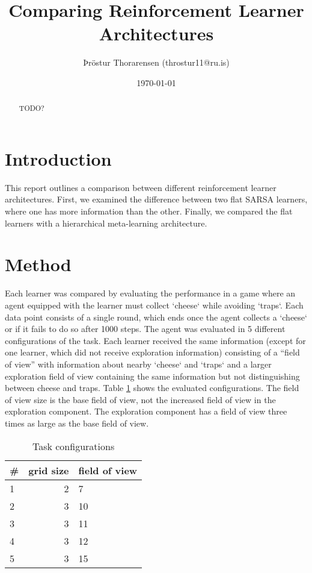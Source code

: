 \documentclass{article}
\begin{document}

\title{Comparing Reinforcement Learner Architectures}
\author{Þröstur Thorarensen (throstur11@ru.is)}
\date{\today}
\maketitle

\begin{abstract}
	TODO?
\end{abstract}

\newpage
\tableofcontents
\newpage

	\section{Introduction}
	This report outlines a comparison between different reinforcement learner architectures. First, we examined the difference between two flat SARSA learners, where one has more information than the other. Finally, we compared the flat learners with a hierarchical meta-learning architecture. 


	\section{Method}
	\label{sec:method}
	Each learner was compared by evaluating the performance in a game where an agent equipped with the learner must collect `cheese` while avoiding `traps`. Each data point consists of a single round, which ends once the agent collects a `cheese` or if it fails to do so after 1000 steps. The agent was evaluated in 5 different configurations of the task.
	Each learner received the same information (except for one learner, which did not receive exploration information) consisting of a ``field of view'' with information about nearby `cheese` and `traps` and a larger exploration field of view containing the same information but not distinguishing between cheese and traps.
	Table \ref{tbl:task-config} shows the evaluated configurations. The field of view size is the base field of view, not the increased field of view in the exploration component. The exploration component has a field of view three times as large as the base field of view.
	
	\begin{table}[h]
		\centering
		\begin{tabular}{l | r | l }
			\# & grid size & field of view \\ 
			\hline
			1 & 2 & 7  \\
			2 & 3 & 10 \\
			3 & 3 & 11 \\
			4 & 3 & 12 \\
			5 & 3 & 15 \\
		 \end{tabular}
		 \caption{Task configurations}
		 \label{tbl:task-config}
	 \end{table}
\end{document}
